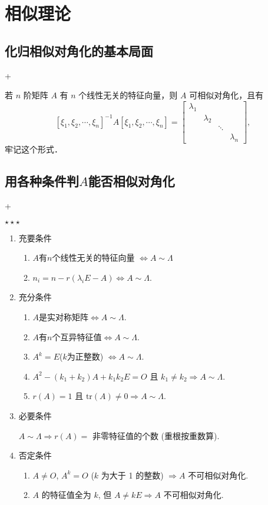 \chapter{相似理论}
\section{化归相似对角化的基本局面}
\DOne+\DTwoThree

若 $n$ 阶矩阵 $A$ 有 $n$ 个线性无关的特征向量，则 $A$ 可相似对角化，且有
$$[\xi_1, \xi_2, \cdots, \xi_n]^{-1} A [\xi_1, \xi_2, \cdots, \xi_n] = \begin{bmatrix} \lambda_1 & & \\ & \lambda_2 & \\ & & \ddots \\ & & & \lambda_n \end{bmatrix},$$
牢记这个形式．

\section{用各种条件判$A$能否相似对角化}
\DOne+\DTwoTwo

$\star \star \star$

\begin{enumerate}
    \item 充要条件
          \begin{enumerate}
              \item $A$有$n$个线性无关的特征向量 $\Leftrightarrow A \sim\Lambda$
              \item $n_i = n - r(\lambda_i E - A) \Leftrightarrow A \sim \Lambda$.
          \end{enumerate}
    \item 充分条件
          \begin{enumerate}
              \item $A$是实对称矩阵$\Leftrightarrow A \sim \Lambda$.
              \item $A$有$n$个互异特征值$\Leftrightarrow A \sim \Lambda$.
              \item $A^k=E$($k$为正整数) $\Leftrightarrow A \sim \Lambda$.
              \item $A^2 - (k_1 + k_2)A + k_1 k_2 E = O$ 且 $k_1 \neq k_2 \Rightarrow A \sim \Lambda$.
              \item $r(A) = 1$ 且 $\text{tr}(A) \neq 0 \Rightarrow A \sim \Lambda$.
          \end{enumerate}
    \item 必要条件

          $A \sim \Lambda \Rightarrow r(A) =$ 非零特征值的个数 (重根按重数算).
    \item 否定条件
          \begin{enumerate}
              \item $A \neq O$, $A^k = O$ ($k$ 为大于 1 的整数) $\Rightarrow A$ 不可相似对角化.
              \item $A$ 的特征值全为 $k$, 但 $A \neq kE \Rightarrow A$ 不可相似对角化.
          \end{enumerate}
\end{enumerate}

